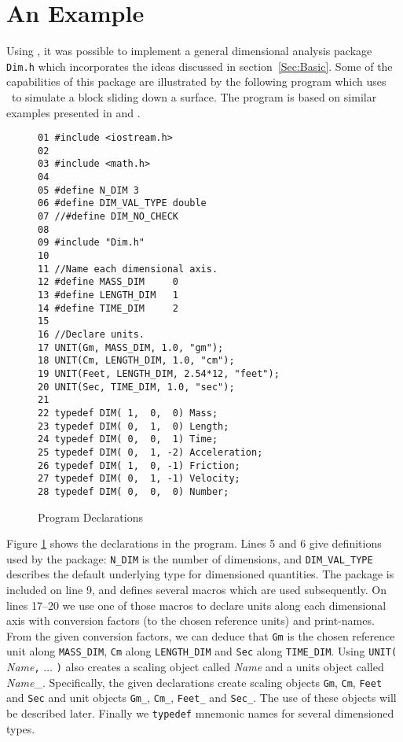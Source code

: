 \section{An Example} 

\label{Sec:Example}

Using \gpp, it was possible to implement a general dimensional
analysis package {\tt Dim.h} which incorporates the ideas
discussed in section~\ref{Sec:Basic}.  Some of the capabilities of
this package are illustrated by the following program which
uses \cpp\ to simulate a block sliding down a surface.  The
program is based on similar examples presented in
\cite{cmelik:88} and \cite{hilfinger:88}.

\begin{figure}

{\footnotesize
\begin{verbatim}
01 #include <iostream.h>
02 
03 #include <math.h>
04 
05 #define N_DIM 3
06 #define DIM_VAL_TYPE double
07 //#define DIM_NO_CHECK
08 
09 #include "Dim.h"
10 
11 //Name each dimensional axis.
12 #define MASS_DIM     0
13 #define LENGTH_DIM   1
14 #define TIME_DIM     2
15 
16 //Declare units.
17 UNIT(Gm, MASS_DIM, 1.0, "gm");
18 UNIT(Cm, LENGTH_DIM, 1.0, "cm");
19 UNIT(Feet, LENGTH_DIM, 2.54*12, "feet");
20 UNIT(Sec, TIME_DIM, 1.0, "sec");
21 
22 typedef DIM( 1,  0,  0) Mass;
23 typedef DIM( 0,  1,  0) Length;
24 typedef DIM( 0,  0,  1) Time;
25 typedef DIM( 0,  1, -2) Acceleration;
26 typedef DIM( 1,  0, -1) Friction;
27 typedef DIM( 0,  1, -1) Velocity;
28 typedef DIM( 0,  0,  0) Number;
\end{verbatim}
}

\caption{Program Declarations}
\label{Fig:Dec}
\end{figure}

Figure \ref{Fig:Dec} shows the declarations in the program.  Lines
5 and 6 give definitions used by the package: {\tt N\_DIM} is the
number of dimensions, and {\tt DIM\_VAL\_TYPE} describes the
default underlying type for dimensioned quantities.  The package
is included on line 9, and defines several macros which are used
subsequently. On lines 17--20 we use one of those macros to
declare units along each dimensional axis with conversion factors
(to the chosen reference units) and print-names.  From the given
conversion factors, we can deduce that {\tt Gm} is the chosen
reference unit along {\tt MASS\_DIM}, {\tt Cm} along {\tt LENGTH\_DIM}
and {\tt Sec} along {\tt TIME\_DIM}.  Using {\tt UNIT(}{\em
Name}{\tt,} $\ldots$ {\tt )} also creates a scaling object called
{\em Name} and a units object called {\em Name}\_.  Specifically,
the given declarations create scaling objects {\tt Gm}, {\tt Cm},
{\tt Feet} and {\tt Sec} and unit objects {\tt Gm\_}, {\tt Cm\_},
{\tt Feet\_} and {\tt Sec\_}.  The use of these objects will be
described later.  Finally we {\tt typedef} mnemonic names for
several dimensioned types.

